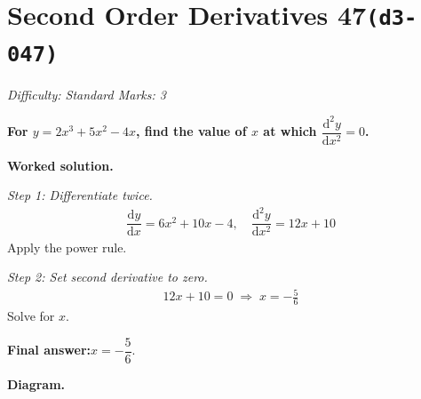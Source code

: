 \documentclass[11pt]{article}
\newcommand{\question}[1]{\par\medskip\noindent\textbf{#1}\par}
\begin{document}
\section*{Second Order Derivatives 47\quad\small\texttt{(d3-047)}}
\textit{Difficulty: Standard \quad\textbar\quad Marks: 3}

\question{For \( y = 2x^3 + 5x^2 - 4x \), find the value of \( x \) at which \( \dfrac{\mathrm{d}^2y}{\mathrm{d}x^2} = 0 \).}

\textbf{Worked solution.}

\textit{Step 1: Differentiate twice.}
\[\begin{gathered}
\dfrac{\mathrm{d}y}{\mathrm{d}x} = 6x^2 + 10x - 4, \quad \dfrac{\mathrm{d}^2y}{\mathrm{d}x^2} = 12x + 10
\end{gathered}\]
Apply the power rule.

\textit{Step 2: Set second derivative to zero.}
\[\begin{gathered}
12x + 10 = 0 \;\Rightarrow\; x = -\tfrac{5}{6}
\end{gathered}\]
Solve for \( x \).

\begin{answerbox}
\textbf{Final answer:}\quad \(\displaystyle  x = -\dfrac{5}{6} \).
\end{answerbox}
\textbf{Diagram.}
\end{document}
